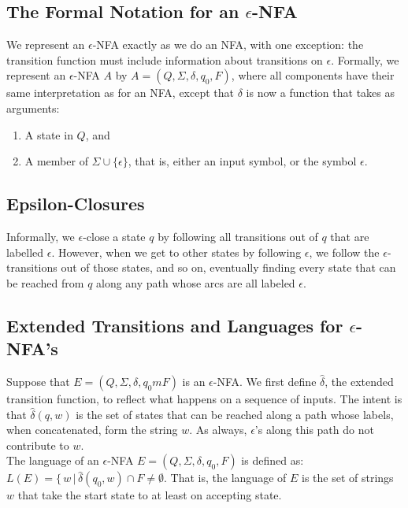 \documentclass[]{article}
\begin{document}
  \subsection*{The Formal Notation for an $\epsilon$-NFA}
    We represent an $\epsilon$-NFA exactly as we do an NFA, with one
    exception: the transition function must include information about
    transitions on $\epsilon$. Formally, we represent an $\epsilon$-NFA $A$ by
    $A = (Q, \Sigma, \delta, q_0, F)$, where all components have their same
    interpretation as for an NFA, except that $\delta$ is now a function that
    takes as arguments:
      \begin{enumerate}
        \item A state in $Q$, and
        \item A member of $\Sigma \cup \{\epsilon\}$, that is, either an input
        symbol, or the symbol $\epsilon$.
      \end{enumerate}

  \subsection*{Epsilon-Closures}
    Informally, we $\epsilon$-close a state $q$ by following all transitions
    out of $q$ that are labelled $\epsilon$. However, when we get to other
    states by following $\epsilon$, we follow the $\epsilon$-transitions out
    of those states, and so on, eventually finding every state that can be
    reached from $q$ along any path whose arcs are all labeled $\epsilon$.

  \subsection*{Extended Transitions and Languages for $\epsilon$-NFA's}
    Suppose that $E = (Q, \Sigma, \delta, q_0m F)$ is an $\epsilon$-NFA. We
    first define $\hat{\delta}$, the extended transition function, to reflect
    what happens on a sequence of inputs. The intent is that $\hat{\delta}(q,
    w)$ is the set of states that can be reached along a path whose labels,
    when concatenated, form the string $w$. As always, $\epsilon$'s along this
    path do not contribute to $w$. \\
    \indent The language of an $\epsilon$-NFA $E = (Q, \Sigma, \delta, q_0, F)
    $ is defined as: $L(E) = \{ \, w \, | \, \hat{\delta}(q_0, w) \cap F \neq
    \emptyset$. That is, the language of $E$ is the set of strings $w$ that
    take the start state to at least on accepting state.
\end{document}
